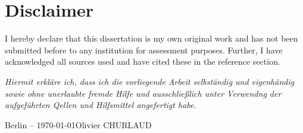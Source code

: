
\chapter*{Disclaimer}

\vfill

I hereby declare that this dissertation is my own original work and has not been submitted 
before to any institution for assessment purposes.  Further, I have acknowledged all sources used and have cited these in the reference section. 

\vspace{1cm}

\noindent \textit{Hiermit erkläre ich, dass ich die vorliegende Arbeit selbständig und eigenhändig sowie ohne unerlaubte fremde Hilfe und ausschließlich unter Verwendng der aufgeführten Qellen und Hilfsmittel angefertigt habe.}

\vspace{3cm}

\noindent  Berlin -- \today \hfill Olivier CHURLAUD 

\vfill